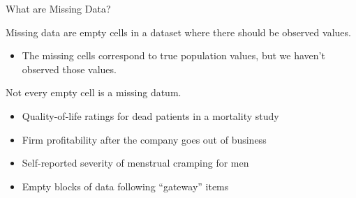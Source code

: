 \documentclass{beamer}\usepackage[]{graphicx}\usepackage[]{color}
\begin{document}

\begin{frame}{What are Missing Data?}
  
  Missing data are empty cells in a dataset where there should be observed 
  values.
  \vc
  \begin{itemize}
  \item The missing cells correspond to true population values, but we haven't 
    observed those values.
  \end{itemize}
  \vb 
  \pause
  Not every empty cell is a missing datum.
  \vc
  \begin{itemize}
  \item Quality-of-life ratings for dead patients in a mortality study
    \vc
  \item Firm profitability after the company goes out of business
    \vc
  \item Self-reported severity of menstrual cramping for men
    \vc
  \item Empty blocks of data following ``gateway'' items
  \end{itemize}
  
\end{frame}

    

\end{document}
